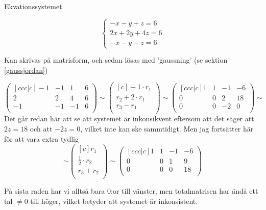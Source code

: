 \documentclass[../../main.tex]{subfiles}
\begin{document}
\begin{solution}{9}

Ekvationssystemet

$$
\begin{cases}
-x - y + z = 6\\
2x + 2y + 4z = 6\\
-x - y - z = 6
\end{cases}
$$

Kan skrivas på matrisform, och sedan lösas med 'gaussning' (se sektion \ref{gaussjordan})

$$
\begin{pmatrix}[ccc|c]
  -1 & -1 & 1 & 6\\
  2 & 2 & 4 & 6\\
  -1 & -1 & -1 & 6\\
\end{pmatrix} 
\sim 
\begin{pmatrix}[c]
  -1\cdot r_1\\
  r_2 + 2\cdot r_1\\
  r_3 - r_1\\
\end{pmatrix}
\sim
\begin{pmatrix}[ccc|c]
  1 & 1 & -1 & -6\\
  0 & 0 & 2 & 18\\
  0 & 0 & -2 & 0\\
\end{pmatrix} 
\sim 
$$
Det går redan här att se att systemet är inkonsikvent eftersom att det säger att $2z = 18$ och att $-2z = 0$, vilket inte kan ske sammtidigt. Men jag fortsätter här för att vara extra tydlig
$$
\sim
\begin{pmatrix}[c]
  r_1\\
  \frac{1}{2}\cdot r_2\\
  r_3 + r_2\\
\end{pmatrix}
\sim
\begin{pmatrix}[ccc|c]
  1 & 1 & -1 & -6\\
  0 & 0 & 1 & 9\\
  0 & 0 & 0 & 18\\
\end{pmatrix} 
$$

På sista raden har vi alltså bara 0:or till vänster, men totalmatrisen har ändå ett tal $\neq 0$ till höger, vilket betyder att systemet är inkonsistent.

\end{solution}
\end{document}
